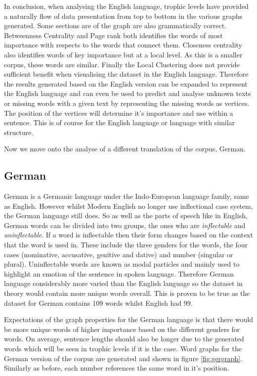 In conclusion, when analysing the English language, trophic levels have provided a naturally flow of data presentation from top to bottom in the various graphs generated. Some sections are of the graph are also grammatically correct. Betweenness Centrality and Page rank both identifies the words of most importance with respects to the words that connect them. Closeness centrality also identifies words of key importance but at a local level. As this is a smaller corpus, these words are similar. Finally the Local Clustering does not provide sufficient benefit when visualising the dataset in the English language. Therefore the results generated based on the English version can be expanded to represent the English language and can even be used to predict and analyse unknown texts or missing words with a given text by representing the missing words as vertices. The position of the vertices will determine it's importance and use within a sentence. This is of course for the English language or language with similar structure.

Now we move onto the analyse of a different translation of the corpus, German.

\subsection{German}
German is a Germanic language under the Indo-European language family, same as English. However whilst Modern English no longer use inflectional case system, the German language still does\cite{durrell2011hammer}. So as well as the parts of speech like in English, German words can be divided into two groups, the ones who are \emph{inflectable} and \emph{uninflectable}. If a word is inflectable then their form changes based on the context that the word is used in. These include the three genders for the words, the four cases (nominative, accusative, genitive and dative) and number (singular or plural). Uninflectable words are known as modal particles and mainly used to highlight an emotion of the sentence in spoken language. Therefore German language considerably more varied than the English language so the dataset in theory would contain more unique words overall. This is proven to be true as the dataset for German contains 109 words whilst English had 99.

Expectations of the graph properties for the German language is that there would be more unique words of higher importance based on the different genders for words. On average, sentence lengths should also be longer due to the generated words which will be seen in trophic levels if it is the case. Word graphs for the German version of the corpus are generated and shown in figure \ref{fig:gergraph}. Similarly as before, each number references the same word in it's position.

